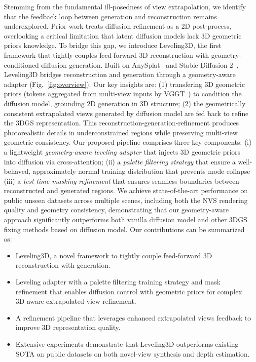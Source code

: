 Stemming from the fundamental ill-posedness of view extrapolation, we identify that the feedback loop between generation and reconstruction remains underexplored. Prior work treats diffusion refinement as a 2D post-process, overlooking a critical limitation that latent diffusion models lack 3D geometric priors knowledge. To bridge this gap, we introduce Leveling3D, the first framework that tightly couples feed-forward 3D reconstruction with geometry-conditioned diffusion generation. Built on AnySplat~\cite{jiang2025anysplat} and Stable Diffusion 2~\cite{Rombach_2022_SD2}, Leveling3D bridges reconstruction and generation through a geometry-aware adapter (Fig.~\ref{fig:overview}). Our key insights are: (1) transfering 3D geometric priors (tokens aggregated from multi-view inputs by VGGT~\cite{wang2025vggt}) to condition the diffusion model, grounding 2D generation in 3D structure; (2) the geometrically consistent extrapolated views generated by diffusion model are fed back to refine the 3DGS representation. This reconstruction-generation-refinement produces photorealistic details in underconstrained regions while preserving multi-view geometric consistency.
Our proposed pipeline comprises three key components: (i) a lightweight \emph{geometry-aware leveling adapter} that injects 3D geometric priors into diffusion via cross-attention; (ii) a \emph{palette filtering strategy} that ensure a well-behaved, approximately normal training distribution that prevents mode collapse (iii) a \emph{test-time masking refinement} that ensures seamless boundaries between reconstructed and generated regions. We achieve state-of-the-art performance on public unseen datasets across multiple scenes, including both the NVS rendering quality and geometry consistency, demonstrating that our geometry-aware approach significantly outperforms both vanilla diffusion model and other 3DGS fixing methods based on diffusion model.
Our contributions can be summarized as:
\begin{itemize}
    \item Leveling3D, a novel framework to tightly couple feed-forward 3D reconstruction with generation.
    \item Leveling adapter with a palette filtering training strategy and mask refinement that enables diffusion control with geometric priors for complex 3D-aware extrapolated view refinement.
    \item A refinement pipeline that leverages enhanced extrapolated views feedback to improve 3D representation quality.
    \item Extensive experiments demonstrate that Leveling3D outperforms existing SOTA on public datasets on both novel-view synthesis and depth estimation.
\end{itemize}



